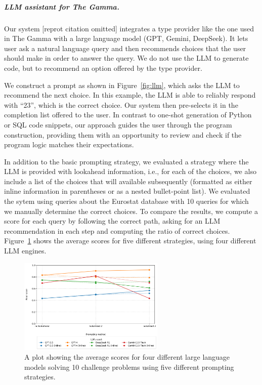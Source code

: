 \documentclass[ a4paper,UKenglish,cleveref, autoref, thm-restate]{lipics-v2021}
\begin{document}
\subparagraph{LLM assistant for The Gamma.}
Our system [reprot citation omitted] integrates a type provider like the one used in The Gamma
with a large language model (GPT, Gemini, DeepSeek). It lets user ask a natural language query and
then recommends choices that the user should make in order to answer the query. We do not
use the LLM to generate code, but to recommend an option offered by the type provider.

We construct a prompt as shown in Figure~\ref{fig:llm}, which asks the LLM to recommend the next
choice. In this example, the LLM is able to reliably respond with ``23'', which is the correct
choice. Our system then pre-selects it in the completion list offered to the user.
In contrast to one-shot generation of Python or SQL code snippets, our approach guides the user
through the program construction, providing them with an opportunity to review and check if the
program logic matches their expectations.

In addition to the basic prompting strategy, we evaluated a strategy where the LLM
is provided with lookahead information, i.e., for each of the choices, we also include a list of
the choices that will available subsequently (formatted as either inline information in parentheses
or as a nested bullet-point list). We evaluated the sytem using queries about the Eurostat
database with 10 queries for which we manually determine the correct choices. To compare the results,
we compute a score for each query by following the correct path, asking for an LLM recommendation
in each step and computing the ratio of correct choices. Figure~\ref{fig:methods} shows the
average scores for five different strategies, using four different LLM engines.

\begin{figure}[t]
\vspace{-1em}
\includegraphics[width=0.62\textwidth]{fig/llm.png}
\caption{A plot showing the average scores for four different large language models
solving 10 challenge problems using five different prompting strategies.}
\label{fig:methods}
\end{figure}
\end{document}
